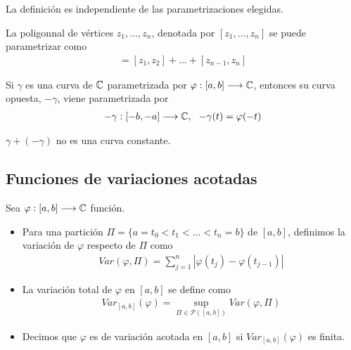 \begin{obs}
    La definición es independiente de las parametrizaciones elegidas.
\end{obs}

\begin{ejemplo}
    La poligonnal de vértices $z_1,...,z_n$, denotada por $[z_1,...,z_n]$ se puede parametrizar como
    \begin{align*}
        [z_1,...,z_n] = [z_1,z_2] + ... + [z_{n-1},z_n]
    \end{align*}
\end{ejemplo}

\begin{defi}
    Si $\gamma$ es una curva de $\mathbb{C}$ parametrizada por $\varphi : [a,b] \longrightarrow \mathbb{C}$, entonces su curva opuesta, $-\gamma$, viene parametrizada por
    \begin{align*}
        -\gamma : [-b,-a] \longrightarrow \mathbb{C}, \ \ -\gamma(t) = \varphi(-t)
    \end{align*}
\end{defi}

\begin{obs}
    $\gamma + (-\gamma)$ no es una curva constante.
\end{obs}

\subsection{Funciones de variaciones acotadas}

\begin{defi}
    Sea $\varphi : [a,b] \longrightarrow \mathbb{C}$ función.
    \begin{itemize}
        \item Para una partición $\Pi = \{ a = t_0 < t_1 < ... < t_n = b \}$ de $[a,b]$, definimos la variación de $\varphi$ respecto de $\Pi$ como
              \begin{align*}
                  Var(\varphi, \Pi) = \sum_{j=1}^{n}{|\varphi(t_j) - \varphi(t_{j-1})|}
              \end{align*}
        \item La variación total de $\varphi$ en $[a,b]$ se define como
              \begin{align*}
                  Var_{[a,b]}(\varphi) = \sup_{\Pi \in \mathcal{P}([a,b])} Var(\varphi, \Pi)
              \end{align*}
        \item Decimos que $\varphi$ es de variación acotada en $[a,b]$ si $Var_{[a,b]}(\varphi)$ es finita.
    \end{itemize}
\end{defi}

